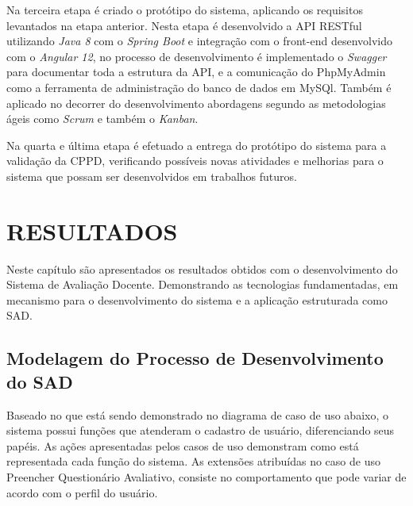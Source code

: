     Na terceira etapa é criado o protótipo do sistema, aplicando os requisitos levantados na etapa anterior. Nesta etapa é desenvolvido a API RESTful utilizando \textit{Java 8} com o  \textit{Spring Boot} e integração com o front-end desenvolvido com o \textit{Angular 12}, no processo de desenvolvimento é implementado o \textit{Swagger} para documentar toda a estrutura da API, e a comunicação do PhpMyAdmin como a ferramenta de administração do banco de dados em MySQl. Também é aplicado no decorrer do desenvolvimento abordagens segundo as metodologias ágeis como \textit{Scrum} e também o \textit{Kanban}.

    Na quarta e última etapa é efetuado a entrega do protótipo do sistema para a validação da CPPD, verificando possíveis novas atividades e melhorias para o sistema que possam ser desenvolvidos em trabalhos futuros. 

    


\chapter{RESULTADOS}

    Neste capítulo são apresentados os resultados obtidos com o desenvolvimento do Sistema de Avaliação Docente. Demonstrando as tecnologias fundamentadas, em mecanismo para o desenvolvimento do sistema e a aplicação estruturada como SAD.
    
    
\section{Modelagem do Processo de Desenvolvimento do SAD}    

    Baseado no que está sendo demonstrado no diagrama de caso de uso abaixo, o sistema possui funções que atenderam o cadastro de usuário, diferenciando seus papéis. As ações apresentadas pelos casos de uso demonstram como está representada cada função do sistema. As extensões atribuídas no caso de uso Preencher Questionário Avaliativo, consiste no comportamento que pode variar de acordo com o perfil do usuário.

